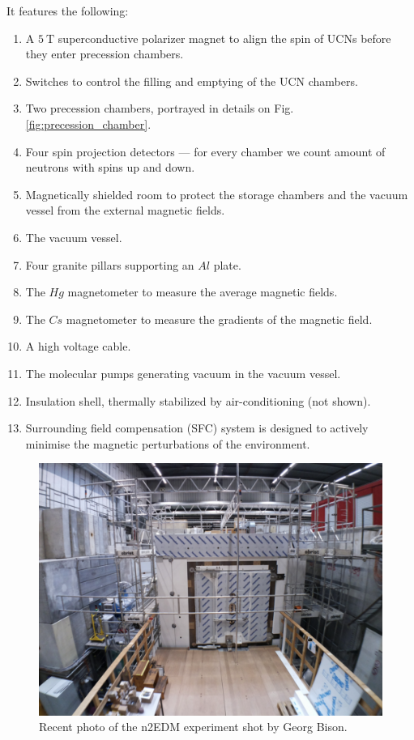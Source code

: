 It features \cite{Abel2018} the following:
\begin{enumerate}
	\item A $5\ \text{T}$ superconductive polarizer magnet to align the spin of UCNs before they enter precession chambers.
	\item Switches to control the filling and emptying of the UCN chambers.
	\item Two precession chambers, portrayed in details on Fig. \ref{fig:precession_chamber}.
	\item Four spin projection detectors --- for every chamber we count amount of neutrons with spins up and down.
	\item Magnetically shielded room to protect the storage chambers and the vacuum vessel from the external magnetic fields.
	\item The vacuum vessel.
	\item Four granite pillars supporting an $Al$ plate.
	\item The $Hg$ magnetometer to measure the average magnetic fields.
	\item The $Cs$ magnetometer to measure the gradients of the magnetic field.
	\item A high voltage cable.
	\item The molecular pumps generating vacuum in the vacuum vessel.
	\item Insulation shell, thermally stabilized by air-conditioning (not shown).
	\item Surrounding field compensation (SFC) system is designed to actively minimise the magnetic perturbations of the environment.
\end{enumerate}

\begin{figure}[h]
	\centering
	\includegraphics[width=.79\textwidth]{img/n2edm_photo}
	\caption{Recent photo of the n2EDM experiment shot by Georg Bison.}
	\label{fig:n2edm_photo}
\end{figure}%